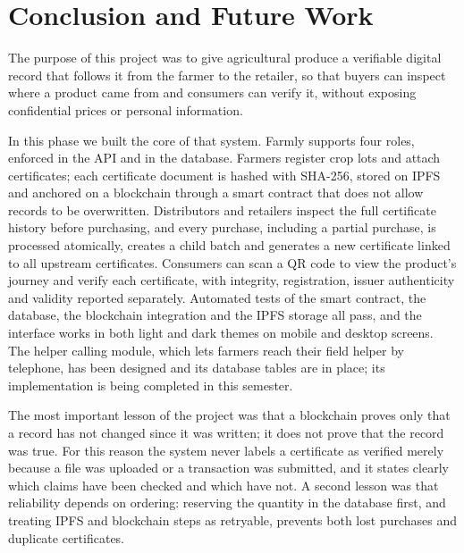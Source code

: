 \chapter{Conclusion and Future Work}
The purpose of this project was to give agricultural produce a verifiable digital record that follows it from the farmer to the retailer, so that buyers can inspect where a product came from and consumers can verify it, without exposing confidential prices or personal information.

In this phase we built the core of that system. Farmly supports four roles, enforced in the API and in the database. Farmers register crop lots and attach certificates; each certificate document is hashed with SHA-256, stored on IPFS and anchored on a blockchain through a smart contract that does not allow records to be overwritten. Distributors and retailers inspect the full certificate history before purchasing, and every purchase, including a partial purchase, is processed atomically, creates a child batch and generates a new certificate linked to all upstream certificates. Consumers can scan a QR code to view the product's journey and verify each certificate, with integrity, registration, issuer authenticity and validity reported separately. Automated tests of the smart contract, the database, the blockchain integration and the IPFS storage all pass, and the interface works in both light and dark themes on mobile and desktop screens. The helper calling module, which lets farmers reach their field helper by telephone, has been designed and its database tables are in place; its implementation is being completed in this semester.

The most important lesson of the project was that a blockchain proves only that a record has not changed since it was written; it does not prove that the record was true. For this reason the system never labels a certificate as verified merely because a file was uploaded or a transaction was submitted, and it states clearly which claims have been checked and which have not. A second lesson was that reliability depends on ordering: reserving the quantity in the database first, and treating IPFS and blockchain steps as retryable, prevents both lost purchases and duplicate certificates.

